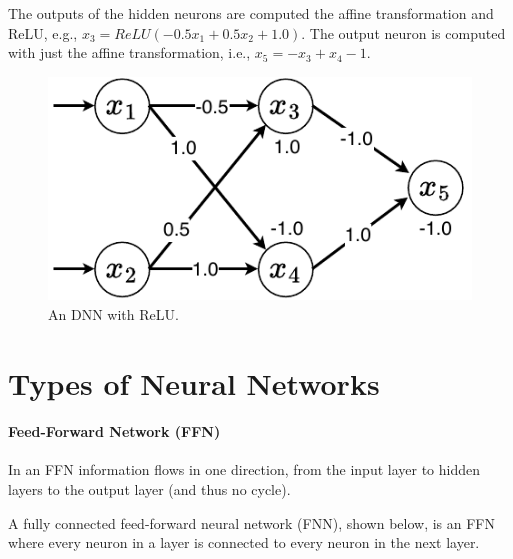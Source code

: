 The outputs of the hidden neurons  are computed the affine transformation and ReLU, e.g., $x_3 = ReLU(-0.5x_1+0.5x_2+1.0)$. The output neuron is computed with just the affine transformation, i.e., $x_5=-x_3+x_4-1$.


\begin{figure}
    \centering
    \includegraphics[width=0.4\linewidth]{figure/dnn.pdf}
    \caption{\label{fig:dnn} An DNN with ReLU.}
\end{figure}


\section{Types of Neural Networks}


\paragraph{Feed-Forward Network (FFN)} In an FFN information flows in one direction, from the input layer to hidden layers to the output layer (and thus no cycle).  

A fully connected feed-forward neural network (FNN), shown below, is an FFN where every neuron in a layer is connected to every neuron in the next layer.
\begin{center}
\end{center}





